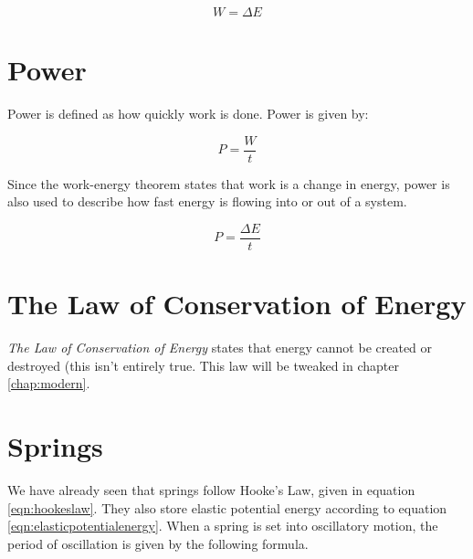 		\begin{mdframed}[backgroundcolor=orange!20!white]
		\begin{equation}
			W = \Delta E
			\label{equation:workenergy}
		\end{equation}
	\end{mdframed}
	
		\section{Power}
	
	
	Power is defined as how quickly work is done.  Power is given by:
	
	\begin{mdframed}[backgroundcolor=orange!20!white]
		\begin{equation}
			P = \frac{W}{t}
			\label{equation:power}
		\end{equation}
	\end{mdframed}
	
	Since the work-energy theorem states that work is a change in energy, power is also used to describe how fast energy is flowing into or out of a system.
	
	\begin{mdframed}[backgroundcolor=orange!20!white]
		\begin{equation}
			P = \frac{\Delta E}{t}
			\label{equation:poweralt}
		\end{equation}
	\end{mdframed}
	

	
	
	\section{The Law of Conservation of Energy}
	\textit{The Law of Conservation of Energy} states that energy cannot be created or destroyed (this isn't entirely true.  This law will be tweaked in chapter \ref{chap:modern}.
	
	\newpage
	\section{Springs}
	
	We have already seen that springs follow Hooke's Law, given in equation \ref{eqn:hookeslaw}.  They also store elastic potential energy according to equation \ref{eqn:elasticpotentialenergy}.  When a spring is set into oscillatory motion, the period of \gls{oscillation} is given by the following formula.
	
